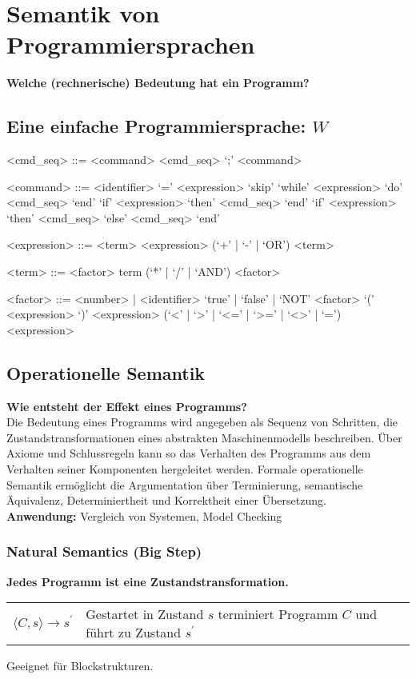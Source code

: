 \documentclass{scrreprt}
\theoremstyle{definition}
\theoremstyle{example}
\theoremstyle{algorithm}
\begin{document}
\chapter{Semantik von Programmiersprachen}
{\Large\textbf{\textsf{Welche (rechnerische) Bedeutung hat ein Programm?}}}

\section{Eine einfache Programmiersprache: $W$}
\setlength{\grammarindent}{3cm} %
\begin{grammar}
<cmd_seq> ::= <command>
\alt <cmd_seq> `;' <command>

<command> ::= <identifier> `=' <expression>
\alt `skip'
\alt `while' <expression> `do' <cmd_seq> `end'
\alt `if' <expression> `then' <cmd_seq> `end'
\alt `if' <expression> `then' <cmd_seq> `else' <cmd_seq> `end'

<expression> ::= <term>
\alt <expression> (`+' | `-' | `OR') <term>

<term> ::= <factor>
\alt term (`*'  | `/' | `AND') <factor>

<factor> ::= <number> | <identifier>
\alt `true' | `false' | `NOT' <factor>
\alt `(' <expression> `)'
\alt <expression> (`<' | `>' | `<=' | `>=' | `<>' | `=') <expression>
\end{grammar}

\section{Operationelle Semantik}
\textbf{\textsf{Wie entsteht der Effekt eines Programms?}}\\
Die Bedeutung eines Programms wird angegeben als Sequenz von Schritten, die Zustandstransformationen eines abstrakten Maschinenmodells beschreiben. Über Axiome und Schlussregeln kann so das Verhalten des Programms aus dem Verhalten seiner Komponenten hergeleitet werden. Formale operationelle Semantik ermöglicht die Argumentation über Terminierung, semantische Äquivalenz, Determiniertheit und Korrektheit einer Übersetzung.\\
\textbf{Anwendung:} Vergleich von Systemen, Model Checking

\subsection{Natural Semantics (Big Step)}
\textbf{\textsf{Jedes Programm ist eine Zustandstransformation.}}\\
\begin{tabularx}{\linewidth}{lX}
$\langle C,s\rangle\rightarrow s^\prime$&Gestartet in Zustand $s$ terminiert Programm $C$ und führt zu Zustand $s^\prime$\\
\end{tabularx}
Geeignet für Blockstrukturen.
\end{document}
